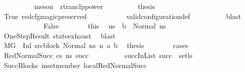 \begin{isabellebody}
\ \ \ \ \ \ \ \ \isamarkupfalse%
\ {\isacharparenleft}{\kern0pt}meson\ {\isachardoublequoteopen}{}{\isachardoublequoteclose}{\isacharparenleft}{\kern0pt}{}{\isacharparenright}{\kern0pt}\ rtranclp{\isacharunderscore}{\kern0pt}power{\isacharparenright}{\kern0pt}\isanewline
\ \ \ \ \ \ \isamarkupfalse%
\ \isamarkupfalse%
\ {\isacharquery}{\kern0pt}thesis\isanewline
\ \ \ \ \ \ \ \ \isamarkupfalse%
\ True\ red{\isacharunderscore}{\kern0pt}cfg{\isacharunderscore}{\kern0pt}magic{\isacharunderscore}{\kern0pt}preserved\ \isanewline
\ \ \ \ \ \ \ \ \isamarkupfalse%
\ valid{\isacharunderscore}{\kern0pt}configuration{\isacharunderscore}{\kern0pt}def\isanewline
\ \ \ \ \ \ \ \ \isamarkupfalse%
\ blast\isanewline
\ \ \ \ \isamarkupfalse%
\isanewline
\ \ \ \ \ \ \isamarkupfalse%
\ False\isanewline
\ \ \ \ \ \ \isamarkupfalse%
\ this\ \isamarkupfalse%
\ ns{}\ \ {\isachardoublequoteopen}b\ {\isacharequal}{\kern0pt}\ Normal\ ns{}{\isachardoublequoteclose}\isanewline
\ \ \ \ \ \ \ \ \isamarkupfalse%
\ OneStepResult\ state{\isachardot}{\kern0pt}exhaust\ \isamarkupfalse%
\ blast\isanewline
\ \ \ \ \ \ \isamarkupfalse%
\ {\isacartoucheopen}M{\isacharcomma}{\kern0pt}{\isasymLambda}{\isacharcomma}{\kern0pt}{\isasymGamma}{\isacharcomma}{\kern0pt}{\isasymOmega}{\isacharcomma}{\kern0pt}G\ {\isasymturnstile}\ {\isacharparenleft}{\kern0pt}Inl\ src{\isacharunderscore}{\kern0pt}block{\isacharcomma}{\kern0pt}\ Normal\ ns{\isacharparenright}{\kern0pt}\ {\isacharminus}{\kern0pt}n{\isasymrightarrow}\ {\isacharparenleft}{\kern0pt}a{\isacharcomma}{\kern0pt}\ b{\isacharparenright}{\kern0pt}{\isacartoucheclose}\ \isamarkupfalse%
\ {\isacharquery}{\kern0pt}thesis\isanewline
\ \ \ \ \ \ \isamarkupfalse%
\ cases\isanewline
\ \ \ \ \ \ \ \ \isamarkupfalse%
\ {\isacharparenleft}{\kern0pt}RedNormalSucc\ cs\ ns{\isacharprime}{\kern0pt}\ succ{\isacharparenright}{\kern0pt}\isanewline
\ \ \ \ \ \ \ \ \isamarkupfalse%
\ succInList{\isacharcolon}{\kern0pt}\ {\isachardoublequoteopen}succ\ {\isasymin}\ set{\isacharparenleft}{\kern0pt}ls{\isacharparenright}{\kern0pt}{\isachardoublequoteclose}\isanewline
\ \ \ \ \ \ \ \ \ \ \isamarkupfalse%
\ SuccBlocks\ in{\isacharunderscore}{\kern0pt}set{\isacharunderscore}{\kern0pt}member\ local{\isachardot}{\kern0pt}RedNormalSucc{\isacharparenleft}{\kern0pt}{}{\isacharparenright}{\kern0pt}\ \isamarkupfalse%

\end{isabellebody}
